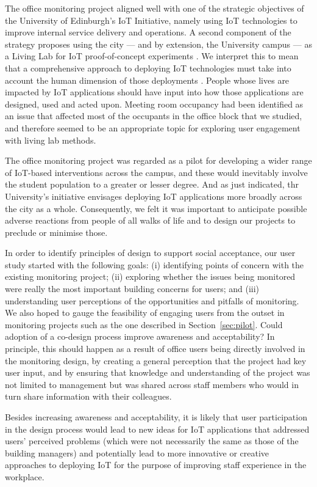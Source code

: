 The office monitoring project aligned well with one of the strategic
objectives of the University of Edinburgh's IoT Initiative, namely
using IoT technologies to improve internal service delivery and
operations. A second component of the strategy proposes using the city
--- and by extension, the University campus --- as a Living Lab for
IoT proof-of-concept experiments \cite{IoT-Strategy}. We interpret
this to mean that a comprehensive approach to deploying IoT
technologies must take into account the human dimension of those
deployments \cite{Shin-2017-UTIO}.  People whose lives are
impacted by IoT applications should have input into how those
applications are designed, used and acted upon. Meeting room occupancy
had been identified as an issue that affected most of the occupants in
the office block that we studied, and therefore seemed to be an
appropriate topic for exploring user engagement with living lab
methods. 

The office monitoring project was regarded as a pilot for
developing a wider range of IoT-based interventions across the campus,
and these would inevitably involve the student population to a greater
or lesser degree. And as just indicated, thr University's initiative
envisages deploying IoT applications more broadly across the city as a
whole. Consequently, we felt it was important to anticipate possible
adverse reactions from people of all walks of life and to design our
projects to preclude or minimise those.  

In order to identify principles of design to support social
acceptance, our user study started with the following goals: (i)
identifying points of concern with the existing monitoring project;
(ii) exploring whether the issues being monitored were really the most
important building concerns for users; and (iii) understanding user
perceptions of the opportunities and pitfalls of monitoring.  We also
hoped to gauge the feasibility of engaging users from the outset in
monitoring projects such as the one described in
Section~\ref{sec:pilot}. Could adoption of a co-design process improve
awareness and acceptability? In principle, this should happen as a
result of office users being directly involved in the monitoring
design, by creating a general perception that the project had key user
input, and by ensuring that knowledge and understanding of the project
was not limited to management but was shared across staff members who
would in turn share information with their colleagues.

Besides increasing awareness and acceptability, it is likely that user
participation in the design process would lead to new ideas for IoT
applications that addressed users’ perceived problems (which were not
necessarily the same as those of the building managers) and
potentially lead to more innovative or creative approaches to
deploying IoT for the purpose of improving staff experience in
the workplace.  

